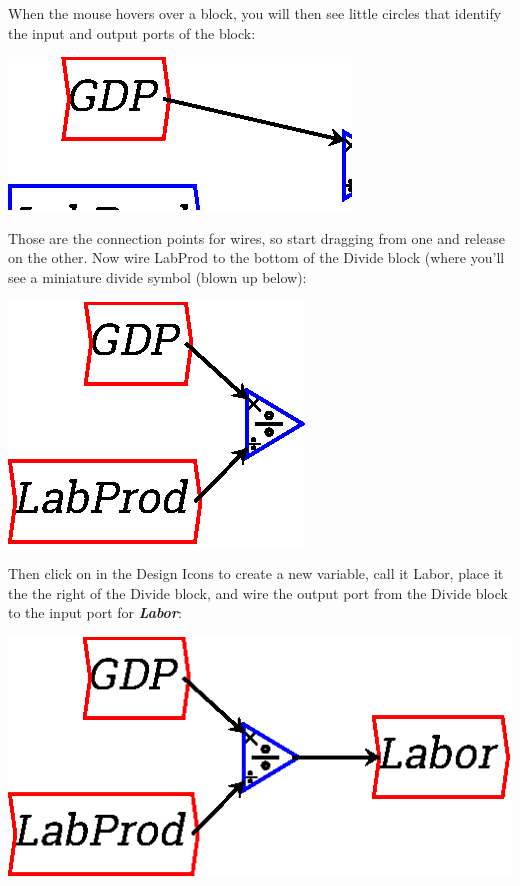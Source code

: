 When the mouse hovers over a block, you will then see little
circles that identify the input and output ports of the block: 

\begin{center}
\includegraphics{images/NewItem75.eps} 
\end{center}

Those are the connection points for wires, so start dragging from one
and release on the other. Now wire LabProd to the bottom of the Divide
block (where you'll see a miniature divide symbol (blown up below): 

\begin{center}
\includegraphics{images/NewItem76.eps} 
\end{center}

Then click on  in the Design Icons to create a new variable, call it
Labor, place it the the right of the Divide block, and wire the output port from the Divide block to the
input port for {\bf\em Labor}: 

\begin{center}
\includegraphics{images/NewItem79.eps} 
\end{center}


